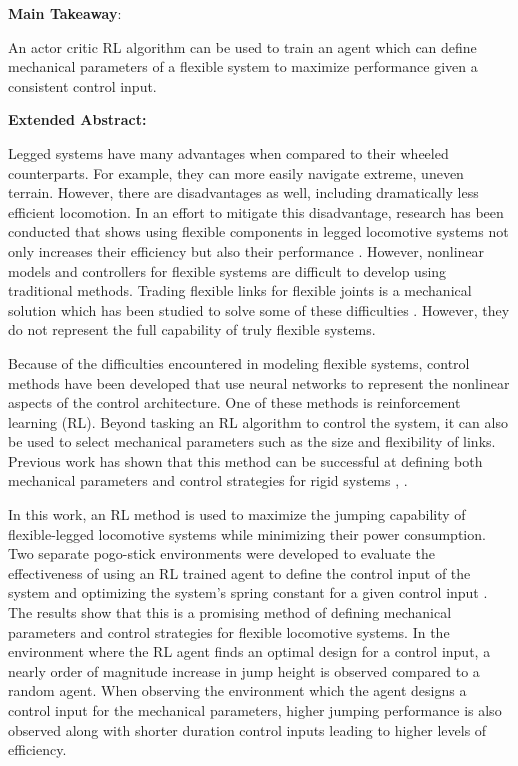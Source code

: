 {\footnotesize{\tir
\begin{center}
    \textbf{Main Takeaway}:
\end{center}
\vspace{-.25in}
An actor critic RL algorithm can be used to train an agent which can define mechanical parameters of a flexible system to maximize performance given a consistent control input.

\begin{center}
    \textbf{Extended Abstract:}
\end{center}
\vspace{-.25in}

Legged systems have many advantages when compared to their wheeled counterparts. For example, they can more easily navigate extreme, uneven terrain. However, there are disadvantages as well, including dramatically less efficient locomotion. In an effort to mitigate this disadvantage, research has been conducted that shows using flexible components in legged locomotive systems not only increases their efficiency but also their performance \cite{Sugiyama2004}. However, nonlinear models and controllers for flexible systems are difficult to develop using traditional methods. Trading flexible links for flexible joints is a mechanical solution which has been studied to solve some of these difficulties \cite{Ghorbel1990}. However, they do not represent the full capability of truly flexible systems. 

Because of the difficulties encountered in modeling flexible systems, control methods have been developed that use neural networks to represent the nonlinear aspects of the control architecture. One of these methods is reinforcement learning (RL). Beyond tasking an RL algorithm to control the system, it can also be used to select mechanical parameters such as the size and flexibility of links. Previous work has shown that this method can be successful at defining both mechanical parameters and control strategies for rigid systems \cite{Schaff2019a}, \cite{Ha2019j}.

In this work, an RL method is used to maximize the jumping capability of flexible-legged locomotive systems while minimizing their power consumption. Two separate pogo-stick environments were developed to evaluate the effectiveness of using an RL trained agent to define the control input of the system and optimizing the system's spring constant for a given control input \cite{Vaughan2013}. The results show that this is a promising method of defining mechanical parameters and control strategies for flexible locomotive systems. In the environment where the RL agent finds an optimal design for a control input, a nearly order of magnitude increase in jump height is observed compared to a random agent. When observing the environment which the agent designs a control input for the mechanical parameters, higher jumping performance is also observed along with shorter duration control inputs leading to higher levels of efficiency.

}}
